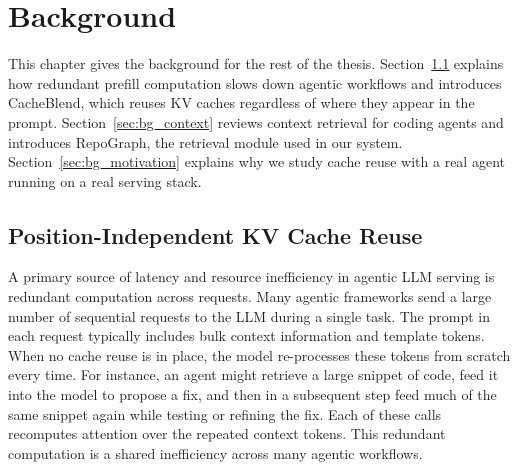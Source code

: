 \chapter{Background}
\label{cha:background}

This chapter gives the background for the rest of the thesis. Section~\ref{sec:bg_kvcache} explains how redundant prefill computation slows down agentic workflows and introduces CacheBlend, which reuses KV caches regardless of where they appear in the prompt. Section~\ref{sec:bg_context} reviews context retrieval for coding agents and introduces RepoGraph, the retrieval module used in our system. Section~\ref{sec:bg_motivation} explains why we study cache reuse with a real agent running on a real serving stack.

\section{Position-Independent KV Cache Reuse}
\label{sec:bg_kvcache}

A primary source of latency and resource inefficiency in agentic LLM serving is redundant computation across requests. Many agentic frameworks send a large number of sequential requests to the LLM during a single task. The prompt in each request typically includes bulk context information and template tokens. When no cache reuse is in place, the model re-processes these tokens from scratch every time. For instance, an agent might retrieve a large snippet of code, feed it into the model to propose a fix, and then in a subsequent step feed much of the same snippet again while testing or refining the fix. Each of these calls recomputes attention over the repeated context tokens. This redundant computation is a shared inefficiency across many agentic workflows.

